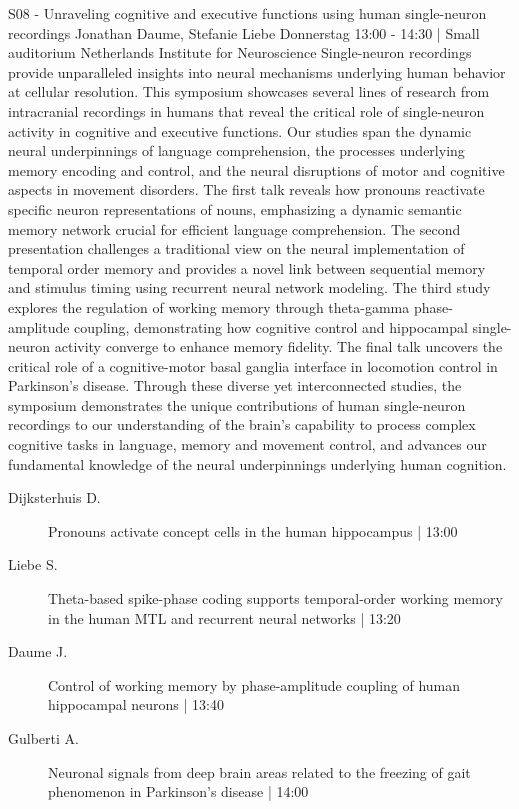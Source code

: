 
            \begin{symposium}
            {S08 - Unraveling cognitive and executive functions using human single-neuron recordings}
            {Jonathan Daume, Stefanie Liebe}
            {Donnerstag 13:00 - 14:30 | Small auditorium}
            {Netherlands Institute for Neuroscience}
            Single-neuron recordings provide unparalleled insights into neural mechanisms underlying human behavior at cellular resolution. This symposium showcases several lines of research from intracranial recordings in humans that reveal the critical role of single-neuron activity in cognitive and executive functions. Our studies span the dynamic neural underpinnings of language comprehension, the processes underlying memory encoding and control, and the neural disruptions of motor and cognitive aspects in movement disorders. The first talk reveals how pronouns reactivate specific neuron representations of nouns, emphasizing a dynamic semantic memory network crucial for efficient language comprehension. The second presentation challenges a traditional view on the neural implementation of temporal order memory and provides a novel link between sequential memory and stimulus timing using recurrent neural network modeling. The third study explores the regulation of working memory through theta-gamma phase-amplitude coupling, demonstrating how cognitive control and hippocampal single-neuron activity converge to enhance memory fidelity. The final talk uncovers the critical role of a cognitive-motor basal ganglia interface in locomotion control in Parkinson's disease. Through these diverse yet interconnected studies, the symposium demonstrates the unique contributions of human single-neuron recordings to our understanding of the brain's capability to process complex cognitive tasks in language, memory and movement control, and advances our fundamental knowledge of the neural underpinnings underlying human cognition.
            \begin{description}    
            
                \item [ Dijksterhuis D.] Pronouns activate concept cells in the human hippocampus \textcolor{mygray}{ | 13:00}    
                
                \item [ Liebe S.] Theta-based spike-phase coding supports temporal-order working memory in the human MTL and recurrent neural networks \textcolor{mygray}{ | 13:20}    
                
                \item [ Daume J.] Control of working memory by phase-amplitude coupling of human hippocampal neurons  \textcolor{mygray}{ | 13:40}    
                
                \item [ Gulberti A.] Neuronal signals from deep brain areas related to the freezing of gait phenomenon in Parkinson’s disease \textcolor{mygray}{ | 14:00}    
                
            \end{description} 
            \end{symposium}
            